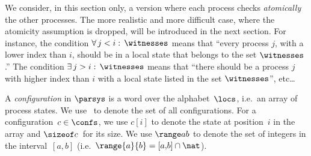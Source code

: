 We consider, in this section only, a version where each process checks
\emph{atomically} the other processes. The more realistic and more
difficult case, where the atomicity assumption is dropped, will be
introduced in the next section.
%
For instance, the condition $\forall\,j<i:\,\witnesses$ means that
“every process $j$, with a lower index than $i$, should be in a local
state that belongs to the set $\witnesses$.”
%
The condition $\exists\,j>i:\,\witnesses$ means that “there should be
a process $j$ with higher index than $i$ with a local state listed in
the set $\witnesses$”, etc\ldots%

\bigskip%
%
%
A \emph{configuration} in $\parsys$ is a word over the
alphabet~$\locs$, i.e.\ an array of process states.
%
We use \confs\ to denote the set of all configurations.
%
For a configuration~$c\in\confs$, we use $c[i]$ to denote %
the state at position~$i$ in the array
and $\sizeof c$~for its size.
%
%
We use $\range a b$ to denote the set of integers in the
interval~$[a{,}b]$ (i.e.\ $\range{a}{b} = [a{,}b]\cap\nat$).

